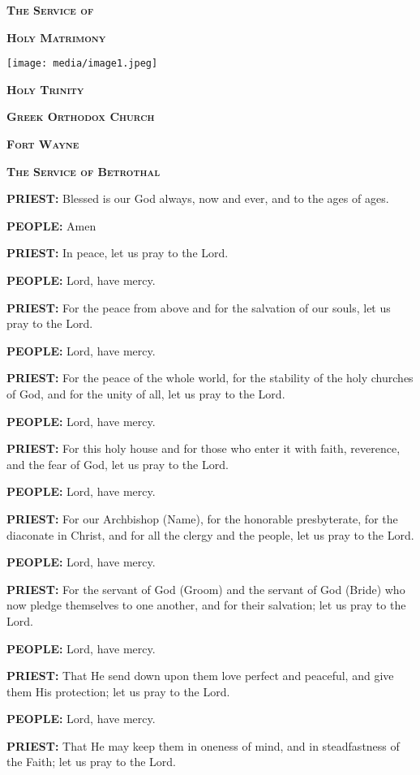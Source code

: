 \textbf{\textsc{The Service of}}

\textbf{\textsc{Holy Matrimony}}

\texttt{[image: media/image1.jpeg]}

\textbf{\textsc{Holy Trinity}}

\textbf{\textsc{Greek Orthodox Church}}

\textbf{\textsc{Fort Wayne}}

\textbf{\textsc{\hfill\break
The Service of Betrothal}}

\textbf{PRIEST:} Blessed is our God always, now and ever, and to the
ages of ages.

\textbf{PEOPLE:} Amen

\textbf{PRIEST:} In peace, let us pray to the Lord.

\textbf{PEOPLE:} Lord, have mercy.

\textbf{PRIEST:} For the peace from above and for the salvation of our
souls, let us pray to the Lord.

\textbf{PEOPLE:} Lord, have mercy.

\textbf{PRIEST:} For the peace of the whole world, for the stability of
the holy churches of God, and for the unity of all, let us pray to the
Lord.

\textbf{PEOPLE:} Lord, have mercy.

\textbf{PRIEST:} For this holy house and for those who enter it with
faith, reverence, and the fear of God, let us pray to the Lord.

\textbf{PEOPLE:} Lord, have mercy.

\textbf{PRIEST:} For our Archbishop (Name), for the honorable
presbyterate, for the diaconate in Christ, and for all the clergy and
the people, let us pray to the Lord.

\textbf{PEOPLE:} Lord, have mercy.

\textbf{PRIEST:} For the servant of God (Groom) and the servant of God
(Bride) who now pledge themselves to one another, and for their
salvation; let us pray to the Lord.

\textbf{PEOPLE:} Lord, have mercy.

\textbf{PRIEST:} That He send down upon them love perfect and peaceful,
and give them His protection; let us pray to the Lord.

\textbf{PEOPLE:} Lord, have mercy.

\textbf{PRIEST:} That He may keep them in oneness of mind, and in
steadfastness of the Faith; let us pray to the Lord.

